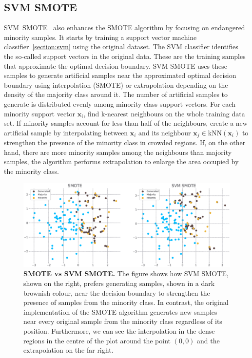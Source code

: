 \subsection{SVM SMOTE}
\label{subsection:svm-smote}

SVM~SMOTE~\cite{svm-smote} also enhances the SMOTE algorithm by focusing on endangered minority
samples. It starts by training a support vector machine classifier~\ref{section:svm} using the
original dataset. The SVM classifier identifies the so-called support vectors in the original data.
These are the training samples that approximate the optimal decision boundary. SVM SMOTE uses these
samples to generate artificial samples near the approximated optimal decision boundary using
interpolation (SMOTE) or extrapolation depending on the density of the majority class around it.
The number of artificial samples to generate is distributed evenly among minority class support
vectors. For each minority support vector $\mathbf{x}_i$, find k-nearest neighbours on the whole
training data set. If minority samples account for less than half of the neighbours, create a new
artificial sample by interpolating between $\mathbf{x}_i$ and its neighbour $\mathbf{x}_j \in
\mathrm{kNN}(\mathbf{x}_i)$ to strengthen the presence of the minority class in crowded regions.
If, on the other hand, there are more minority samples among the neighbours than majority samples,
the algorithm performs extrapolation to enlarge the area occupied by the minority class.

\begin{figure}
    \centering
    \includegraphics[width=\linewidth]{figures/smote_vs_svmsmote.eps}
    \caption{
        \textbf{SMOTE vs SVM SMOTE.} The figure shows how SVM SMOTE, shown on the right, prefers
        generating samples, shown in a dark brownish colour, near the decision boundary to
        strengthen the presence of samples from the minority class. In contrast, the original
        implementation of the SMOTE algorithm generates new samples near every original sample from
        the minority class regardless of its position. Furthermore, we can see the interpolation in
        the dense regions in the centre of the plot around the point $(0, 0)$ and the extrapolation
        on the far right.
    }
    \label{figure:smote-vs-svmsmote}
\end{figure}


